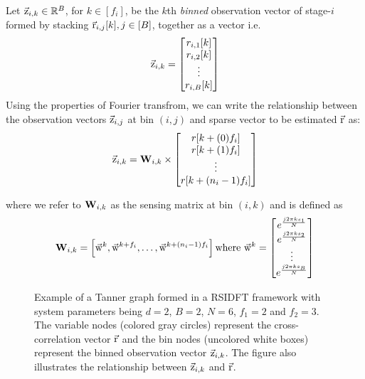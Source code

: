 	 Let $\vec{\mathrm{z}}_{i,k}\in\mathbb{R}^{B}$, for $k\in [f_i]$, be the $k$th \textit{binned} observation vector of stage-$i$ formed by stacking $\vec{\mathrm{r}}_{i,j}[k], j\in[B]$, together as a vector i.e.
\[
	  \vec{\mathrm{z}}_{i,k} = \begin{bmatrix}
	 r_{i,1}[k] \\
	 r_{i,2}[k] \\
	 \vdots\\
	 r_{i,B}[k]
	 \end{bmatrix}  
\]
Using the properties of Fourier transfrom, we can write the relationship between the observation vectors $\vec{\mathrm{z}}_{i,j}$ at bin $(i,j)$ and sparse vector to be estimated $\vec{\mathrm{r}}$ as:
\begin{align}
	\label{Eqn:Generator Equation}
	\vec{\mathrm{z}}_{i,k}= \mathbf{W}_{i,k} \times
	\begin{bmatrix}
		r[k+(0)f_i] \\
		r[k+(1)f_i] \\
		\vdots\\
		r[k+(n_i-1)f_i]
	\end{bmatrix}
\end{align}

where we refer to $\mathbf{W}_{i,k}$ as the sensing matrix at bin $(i,k)$ and is defined as  
\begin{align}\label{Eqn:Sensing Matrix}
	\mathbf{W}_{i,k} = \left[\vec{\mathrm{w}}^{k},\vec{\mathrm{w}}^{k+f_i},\ldots, \vec{\mathrm{w}}^{k+(n_i-1)f_i}\right] \text{where} ~\vec{\mathrm{w}}^{k}=
	\begin{bmatrix}
		e^{\frac{j2\pi ks_1}{N}}\\
		e^{\frac{j2\pi ks_2}{N}}\\
		\vdots\\
		e^{\frac{j2\pi ks_B}{N}}
	\end{bmatrix}
\end{align}

\begin{figure}[h!]
	\begin{center}
	 	\resizebox{0.75\textwidth}{!}{}	
	\end{center}	   
	\caption{Example of a Tanner graph formed in a RSIDFT framework with system parameters being $d=2$, $B=2$, $N=6$, $f_1 = 2$ and $f_2=3$. The variable nodes (colored gray circles) represent the cross-correlation vector $\vec{\mathrm{r}}$ and the bin nodes (uncolored white boxes) represent the binned observation vector $\vec{\mathrm{z}}_{i,k}$. The figure also illustrates the relationship between $\vec{\mathrm{z}}_{i,k}$ and $\vec{\mathrm{r}}$.}\label{fig:factorgraph}
	\vspace{5 pt}
\end{figure}

